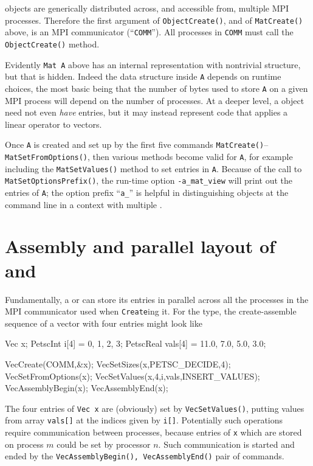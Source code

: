 \PETSc objects are generically distributed across, and accessible from, multiple MPI processes.  Therefore the first argument of \texttt{ObjectCreate()}, and of \texttt{MatCreate()} above, is an MPI communicator (``\texttt{COMM}'').  All processes in \texttt{COMM} must call the \texttt{ObjectCreate()} method.

Evidently \texttt{Mat A} above has an internal representation with nontrivial structure, but that is hidden.  Indeed the data structure inside \texttt{A} depends on runtime choices, the most basic being that the number of bytes used to store \texttt{A} on a given MPI process will depend on the number of processes.  At a deeper level, a \PETSc \pMat object need not even \emph{have} entries, but it may instead represent code that applies a linear operator to vectors.

Once \texttt{A} is created and set up by the first five commands \texttt{MatCreate()}--\texttt{MatSetFromOptions()}, then various methods become valid for \texttt{A}, for example including the \texttt{MatSetValues()} method to set entries in \texttt{A}.  Because of the call to \texttt{MatSetOptionsPrefix()}, the run-time option \texttt{-a\_mat\_view} will print out the entries of \texttt{A}; the option prefix ``\texttt{a\_}'' is helpful in distinguishing \pMat objects at the command line in a context with multiple \pMats.


\section{Assembly and parallel layout of \pVecs and \pMats}

Fundamentally, a \pVec or \pMat can store its entries in parallel across all the processes in the MPI communicator used when \texttt{Create}ing it.  For the \pVec type, the create-assemble sequence of a vector with four entries might look like
\begin{code}
Vec x;
PetscInt   i[4] = {0, 1, 2, 3};
PetscReal  vals[4] = {11.0, 7.0, 5.0, 3.0};

VecCreate(COMM,&x);
VecSetSizes(x,PETSC_DECIDE,4);
VecSetFromOptions(x);
VecSetValues(x,4,i,vals,INSERT_VALUES);
VecAssemblyBegin(x);
VecAssemblyEnd(x);
\end{code}
The four entries of \texttt{Vec x} are (obviously) set by \texttt{VecSetValues()}, putting values from array \texttt{vals[]} at the indices given by \texttt{i[]}.  Potentially such operations require communication between processes, because entries of \texttt{x} which are stored on process $m$ could be set by processor $n$.  Such communication is started and ended by the \texttt{VecAssemblyBegin(), VecAssemblyEnd()} pair of commands.

